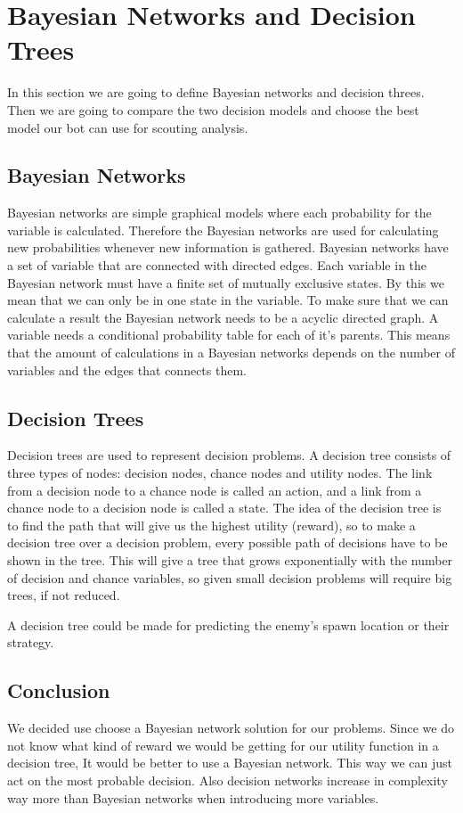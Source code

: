 \section{Bayesian Networks and Decision Trees}
In this section we are going to define Bayesian networks and decision threes. Then we are going to compare the two decision models and choose the best model our bot can use for scouting analysis.

\subsection{Bayesian Networks}
	Bayesian networks are simple graphical models where each probability for the variable is calculated. Therefore the Bayesian networks are used for calculating new probabilities whenever new information is gathered. Bayesian networks have a  set of variable that are connected with directed edges. Each variable in the Bayesian network must have a finite set of mutually exclusive states. By this we mean that we can only be in one state in the variable. To make sure that we can calculate a result the Bayesian network needs to be a acyclic directed graph. A variable needs a conditional probability table for each of it's parents. This means that the amount of calculations in a Bayesian networks depends on the number of variables and the edges that connects them.

\subsection{Decision Trees}
Decision trees are used to represent decision problems. A decision tree consists of three types of nodes: decision nodes, chance nodes and utility nodes. The link from a decision node to a chance node is called an action, and a link from a chance node to a decision node is called a state. The idea of the decision tree is to find the path that will give us the highest utility (reward), so to make a decision tree over a decision problem, every possible path of decisions have to be shown in the tree. This will give a tree that grows exponentially with the number of decision and chance variables, so given small decision problems will require big trees, if not reduced. 
	
A decision tree could be made for predicting the enemy's spawn location or their strategy. 
	
\subsection{Conclusion}
We decided use choose a Bayesian network solution for our problems. Since we do not know what kind of reward we would be getting for our utility function in a decision tree, It would be better to use a Bayesian network. This way we can just act on the most probable decision. Also decision networks increase in complexity way more than Bayesian networks when introducing more variables.